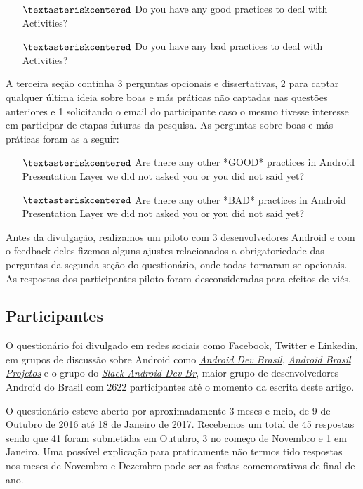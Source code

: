 \begin{itemize} 
	\item[$\textasteriskcentered$] Do you have any good practices to deal with Activities?
	\item[$\textasteriskcentered$] Do you have any bad practices to deal with Activities? 
\end{itemize}

A terceira se\c{c}\~ao continha 3 perguntas opcionais e dissertativas, 2 para captar qualquer \'ultima ideia sobre boas e m\'as pr\'aticas n\~ao captadas nas quest\~oes anteriores e 1 solicitando o email do participante caso o mesmo tivesse interesse em participar de etapas futuras da pesquisa. As perguntas sobre boas e m\'as pr\'aticas foram as a seguir: 

\begin{itemize} 
	\item[$\textasteriskcentered$] Are there any other *GOOD* practices in Android Presentation Layer we did not asked you or you did not said yet?
	\item[$\textasteriskcentered$] Are there any other *BAD* practices in Android Presentation Layer we did not asked you or you did not said yet?
\end{itemize}

Antes da divulga\c{c}\~ao, realizamos um piloto com 3 desenvolvedores Android e com o feedback deles fizemos alguns ajustes relacionados a obrigatoriedade das perguntas da segunda se\c{c}\~ao do question\'ario, onde todas tornaram-se opcionais. As respostas dos participantes piloto foram desconsideradas para efeitos de vi\'es. 

\subsection{Participantes}
\label{sub:participantes}

O question\'ario foi divulgado em redes sociais como Facebook, Twitter e Linkedin, em grupos de discuss\~ao sobre Android como \href{https://groups.google.com/forum/#!forum/androidbrasil-dev}{\textit{Android Dev Brasil}}, \href{https://groups.google.com/forum/\#!forum/android-brasil-projetos}{\textit{Android Brasil Projetos}} e o grupo do \href{http://slack.androiddevbr.org/}{\textit{Slack Android Dev Br}}, maior grupo de desenvolvedores Android do Brasil com 2622 participantes at\'e o momento da escrita deste artigo. 

O question\'ario esteve aberto por aproximadamente 3 meses e meio, de 9 de Outubro de 2016 at\'e 18 de Janeiro de 2017. Recebemos um total de 45 respostas sendo que 41 foram submetidas em Outubro, 3 no come\c{c}o de Novembro e 1 em Janeiro. Uma poss\'ivel explica\c{c}\~ao para praticamente n\~ao termos tido respostas nos meses de Novembro e Dezembro pode ser as festas comemorativas de final de ano. 

